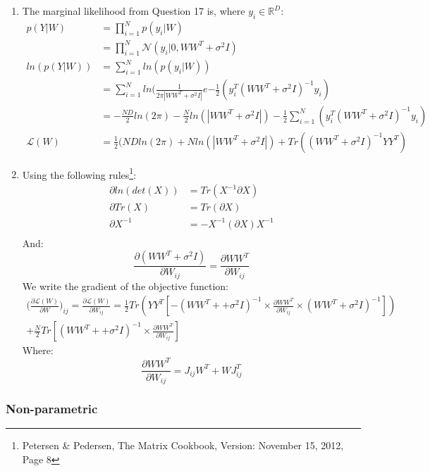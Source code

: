 \documentclass[a4paper,11pt]{article}
\theoremstyle{mytheor}
\begin{document}
\begin{enumerate}
\item The marginal likelihood from Question 17 is, where $y_i \in \mathbb{R}^D$: 
\begin{align*}
p(Y|W) &= \prod\limits_{i=1}^{N} p(y_i|W)\\
    &= \prod\limits_{i=1}^{N}\mathcal{N}(y_i| 0 , WW^T + \sigma^2I)\\
ln(p(Y|W)) &= \sum\limits_{i=1}^{N} ln(p(y_i|W))\\
    &= \sum\limits_{i=1}^{N} ln(\frac{1}{2\pi|WW^T + \sigma^2I|}e{-\frac{1}{2}(y_i^T(WW^T + \sigma^2I)^{-1}y_i)}\\
    &= -\frac{ND}{2}ln(2\pi)-\frac{N}{2}ln(|WW^T+\sigma^2I|)-\frac{1}{2}\sum\limits_{i=1}^{N}(y_i^T(WW^T + \sigma^2I)^{-1}y_i)\\
 \mathcal{L}(W)&=\frac{1}{2}(ND ln(2\pi)+Nln(|WW^T+\sigma^2I|)+ Tr ((WW^T+\sigma^2I)^{-1}YY^T)
\end{align*}
\item
Using the following rules\footnote{Petersen \& Pedersen, The Matrix Cookbook, Version: November 15, 2012, Page 8}:
\begin{align*}
\partial ln(det(X)) &= Tr(X^{-1} \partial X )\\
\partial Tr(X) &= Tr(\partial X)\\
\partial X^{-1} &=-X^{-1}(\partial X) X^{-1}\\
\end{align*}
And:
\begin{equation*}
\frac{\partial (WW^T+\sigma^2I)}{\partial W_{ij}} = \frac{\partial WW^T}{\partial W_{ij}}
\end{equation*}
We write the gradient of the objective function:
\begin{multline*}
\Bigg(\frac{\partial \mathcal{L}(W)}{\partial W}\Bigg)_{ij}= \frac{\partial \mathcal{L}(W)}{\partial W_{ij}} = \frac{1}{2} Tr(YY^T[-(WW^T++\sigma^2I)^{-1} \times \frac{\partial WW^T}{\partial W_{ij}} \times (WW^T+\sigma^2I)^{-1}])\\
+ \frac{N}{2} Tr[(WW^T++\sigma^2I)^{-1} \times \frac{\partial WW^T}{\partial W_{ij}}]
\end{multline*}
Where: 
\begin{equation*}
\frac{\partial WW^T}{\partial W_{ij}} = J_{ij} W^T+WJ_{ij}^{T}
\end{equation*}
\end{enumerate}

\subsubsection{Non-parametric}
\end{document}

